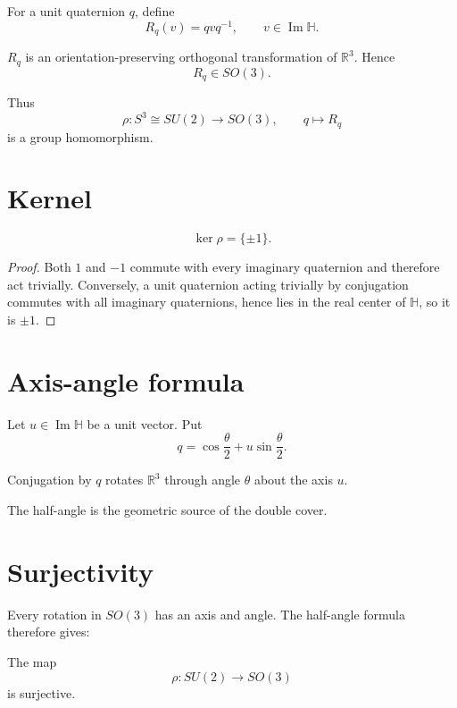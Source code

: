 For a unit quaternion \(q\), define
\[
R_q(v)=qvq^{-1},
\qquad v\in\operatorname{Im}\mathbb H.
\]

\begin{theorem}
\label{thm:viii13-quaternion-rotation}
\(R_q\) is an orientation-preserving orthogonal transformation of
\(\mathbb R^3\).  Hence
\[
R_q\in SO(3).
\]
\end{theorem}

Thus
\[
\rho:S^3\cong SU(2)\longrightarrow SO(3),
\qquad
q\longmapsto R_q
\]
is a group homomorphism.

\section{Kernel}

\begin{theorem}
\label{thm:viii13-kernel}
\[
\ker\rho=\{\pm1\}.
\]
\end{theorem}

\begin{proof}
Both \(1\) and \(-1\) commute with every imaginary quaternion and therefore
act trivially.  Conversely, a unit quaternion acting trivially by conjugation
commutes with all imaginary quaternions, hence lies in the real center of
\(\mathbb H\), so it is \(\pm1\).
\end{proof}

\section{Axis-angle formula}

Let \(u\in\operatorname{Im}\mathbb H\) be a unit vector.  Put
\[
q=\cos\frac{\theta}{2}+u\sin\frac{\theta}{2}.
\]

\begin{theorem}
\label{thm:viii13-half-angle}
Conjugation by \(q\) rotates \(\mathbb R^3\) through angle \(\theta\) about the
axis \(u\).
\end{theorem}

The half-angle is the geometric source of the double cover.

\section{Surjectivity}

Every rotation in \(SO(3)\) has an axis and angle.  The half-angle formula
therefore gives:

\begin{theorem}[Surjectivity]
\label{thm:viii13-surjective}
The map
\[
\rho:SU(2)\to SO(3)
\]
is surjective.
\end{theorem}

